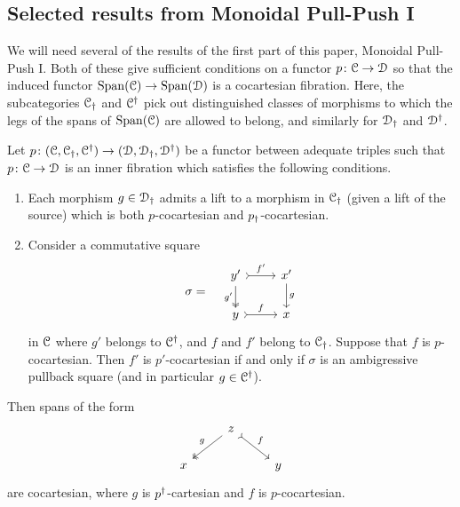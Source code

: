 \documentclass[main.tex]{subfiles}
\begin{document}
\subsection{Selected results from Monoidal Pull-Push I}
\label{ssc:selected_results_from_mppi}

We will need several of the results of the first part of this paper, Monoidal Pull-Push I. Both of these give sufficient conditions on a functor $p\colon \mathcal{C} \to \mathcal{D}$ so that the induced functor $\mathrm{Span}(\mathcal{C}) \to \mathrm{Span}(\mathcal{D})$ is a cocartesian fibration. Here, the subcategories $\mathcal{C}_{\dagger}$ and $\mathcal{C}^{\dagger}$ pick out distinguished classes of morphisms to which the legs of the spans of $\mathrm{Span}(\mathcal{C})$ are allowed to belong, and similarly for $\mathcal{D}_{\dagger}$ and $\mathcal{D}^{\dagger}$.

\begin{theorem}
  \label{thm:old_barwick}
  Let $p\colon (\mathcal{C}, \mathcal{C}_{\dagger}, \mathcal{C}^{\dagger}) \to (\mathcal{D}, \mathcal{D}_{\dagger}, \mathcal{D}^{\dagger})$ be a functor between adequate triples such that $p\colon \mathcal{C} \to \mathcal{D}$ is an inner fibration which satisfies the following conditions.
  \begin{enumerate}
    \item Each morphism $g \in \mathcal{D}_{\dagger}$ admits a lift to a morphism in $\mathcal{C}_{\dagger}$ (given a lift of the source) which is both $p$-cocartesian and $p_{\dagger}$-cocartesian.

    \item Consider a commutative square
      \begin{equation*}
        \sigma = \quad
        \begin{tikzcd}
          y'
          \arrow[r, rightarrowtail, "f'"]
          \arrow[d, two heads, swap, "g'"]
          & x'
          \arrow[d, "g"]
          \\
          y
          \arrow[r, rightarrowtail, "f"]
          & x
        \end{tikzcd}
      \end{equation*}
      in $\mathcal{C}$ where $g'$ belongs to $\mathcal{C}^{\dagger}$, and $f$ and $f'$ belong to $\mathcal{C}_{\dagger}$. Suppose that $f$ is $p$-cocartesian. Then $f'$ is $p'$-cocartesian if and only if $\sigma$ is an ambigressive pullback square (and in particular $g \in \mathcal{C}^{\dagger}$).
  \end{enumerate}

  Then spans of the form
  \begin{equation*}
    \begin{tikzcd}
      & z
      \arrow[dl, two heads, swap, "g"]
      \arrow[dr, rightarrowtail, "f"]
      \\
      x
      && y
    \end{tikzcd}
  \end{equation*}
  are cocartesian, where $g$ is $p^{\dagger}$-cartesian and $f$ is $p$-cocartesian.
\end{theorem}
\end{document}

